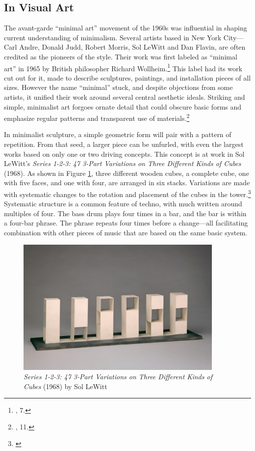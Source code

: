 \documentclass[12pt,twoside]{reedthesis}
\begin{document}
\subsection{In Visual Art}
The avant-garde ``minimal art'' movement of the 1960s was influential in shaping current understanding of minimalism. Several artists based in New York City---Carl Andre, Donald Judd, Robert Morris, Sol LeWitt and Dan Flavin, are often credited as the pioneers of the style. Their work was first labeled as ``minimal art'' in 1965 by British philosopher Richard Wollheim.\footnote{\cite{batchelorMinimalism1997}, 7.} This label had its work cut out for it, made to describe sculptures, paintings, and installation pieces of all sizes. However the name ``minimal'' stuck, and despite objections from some artists, it unified their work around several central aesthetic ideals. Striking and simple, minimalist art forgoes ornate detail that could obscure basic forms and emphasize regular patterns and transparent use of materials.\footnote{\cite{batchelorMinimalism1997}, 11.}

In minimalist sculpture, a simple geometric form will pair with a pattern of repetition. From that seed, a larger piece can be unfurled, with even the largest works based on only one or two driving concepts. This concept is at work in Sol LeWitt's \emph{Series 1-2-3: 47 3-Part Variations on Three Different Kinds of Cubes} (1968). As shown in Figure \ref{fig:sol}, three different wooden cubes, a complete cube, one with five faces, and one with four, are arranged in six stacks. Variations are made with systematic changes to the rotation and placement of the cubes in the tower.\footnote{\cite{lewittSeries123471968}} Systematic structure is a common feature of techno, with much written around multiples of four. The bass drum plays four times in a bar, and the bar is within a four-bar phrase. The phrase repeats four times before a change---all facilitating combination with other pieces of music that are based on the same basic system.

\begin{figure}[htbp]
	\begin{centering}
		\includegraphics[width=4in]{./Images/LeWitt_1-2-3}
		\caption{\emph{Series 1-2-3: 47 3-Part Variations on Three Different Kinds of Cubes} (1968) by Sol LeWitt}
		\label{fig:sol}
	\end{centering}
\end{figure}
\end{document}
